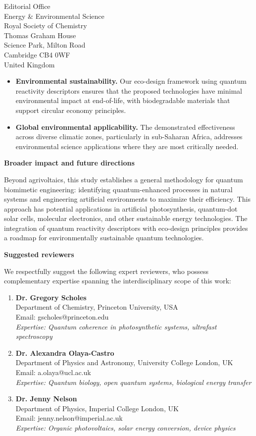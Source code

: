 \documentclass[11pt]{letter}
\begin{document}
\begin{letter}{Editorial Office\\
Energy \& Environmental Science\\
Royal Society of Chemistry\\
Thomas Graham House\\
Science Park, Milton Road\\
Cambridge CB4 0WF\\
United Kingdom}
\begin{itemize}
    \item \textbf{Environmental sustainability.} Our eco-design framework using quantum reactivity descriptors ensures that the proposed technologies have minimal environmental impact at end-of-life, with biodegradable materials that support circular economy principles.
    
    \item \textbf{Global environmental applicability.} The demonstrated effectiveness across diverse climatic zones, particularly in sub-Saharan Africa, addresses environmental science applications where they are most critically needed.
\end{itemize}

\textbf{Broader impact and future directions}

Beyond agrivoltaics, this study establishes a general methodology for quantum biomimetic engineering: identifying quantum-enhanced processes in natural systems and engineering artificial environments to maximize their efficiency. This approach has potential applications in artificial photosynthesis, quantum-dot solar cells, molecular electronics, and other sustainable energy technologies. The integration of quantum reactivity descriptors with eco-design principles provides a roadmap for environmentally sustainable quantum technologies.

\textbf{Suggested reviewers}

We respectfully suggest the following expert reviewers, who possess complementary expertise spanning the interdisciplinary scope of this work:

\begin{enumerate}
\item \textbf{Dr. Gregory Scholes}\\
Department of Chemistry, Princeton University, USA\\
Email: gscholes@princeton.edu\\
\textit{Expertise: Quantum coherence in photosynthetic systems, ultrafast spectroscopy}

\item \textbf{Dr. Alexandra Olaya-Castro}\\
Department of Physics and Astronomy, University College London, UK\\
Email: a.olaya@ucl.ac.uk\\
\textit{Expertise: Quantum biology, open quantum systems, biological energy transfer}

\item \textbf{Dr. Jenny Nelson}\\
Department of Physics, Imperial College London, UK\\
Email: jenny.nelson@imperial.ac.uk\\
\textit{Expertise: Organic photovoltaics, solar energy conversion, device physics}


\end{enumerate}
\end{letter}
\end{document}
